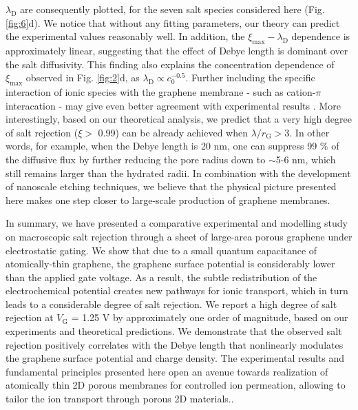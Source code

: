 \documentclass[journal=nalefd,email=true, hyperref=true, keywords=false]{achemso}
\newcommand{\Fig}{Fig.}
\begin{document}
$\lambda_{\mathrm{D}}$ are consequently plotted, for the seven salt
species considered here (\Fig{} \ref{fig:6}d). 
We notice that
without any fitting parameters, our theory can predict the
experimental values reasonably well.  In addition, the
$\xi_{\mathrm{max}}-\lambda_{\mathrm{D}}$ dependence is approximately
linear, suggesting that the effect of Debye length is dominant over
the salt diffusivity. This finding also explains the concentration
dependence of $\xi_{\mathrm{max}}$ observed in \Fig{} \ref{fig:2}d, as
$\lambda_{\mathrm{D}} \propto c_{0}^{-0.5}$. Further including the
specific interaction of ionic species with the graphene membrane
{- such as cation-$\pi$ interacation \cite{shi2013ion}} - may give even better agreement with experimental
results \cite{Ghosh_2018}. More interestingly, based on our theoretical analysis, we
predict that a very high degree of salt rejection ($\xi>$ 0.99) can be
already achieved when $\lambda / r_{\mathrm{G}}>$3. In other words,
for example, when the Debye length is 20 nm, one can suppress 99 \% of
the diffusive flux by further reducing the pore radius down to
$\sim$5-6 nm, which still remains larger than the hydrated radii. In
combination with the development of nanoscale etching techniques, we
believe that the physical picture presented here makes one step closer
to large-scale production of graphene membranes.

In summary, we have presented a comparative experimental and modelling
study on macroscopic salt rejection through a sheet of large-area
porous graphene under electrostatic gating. We show that due to a
small quantum capacitance of atomically-thin graphene, the graphene
surface potential is considerably lower than the applied gate
voltage. As a result, the subtle redistribution of the electrochemical
potential creates new pathways for ionic transport, which in turn
leads to a considerable degree of salt rejection. We report a high
degree of salt rejection at $V_{\mathrm{G}}$ = 1.25 V by approximately
one order of magnitude, based on our experiments and theoretical
predictions. We demonstrate that the observed salt
rejection positively correlates with the Debye length that nonlinearly
modulates the graphene surface potential and charge density. The
experimental results and fundamental principles presented here open an
avenue towards realization of atomically thin 2D porous membranes for
{ controlled ion permeation, allowing to tailor the ion transport through porous 2D materials.}.
\end{document}
